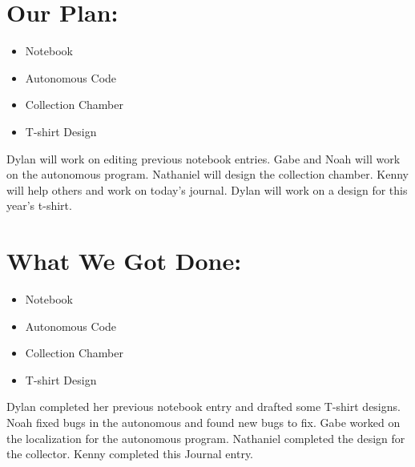 \documentclass[12pt]{article}
\begin{document}
\section{Our Plan:} %
\begin{itemize}
	\item Notebook

	\item Autonomous Code

	\item Collection Chamber

	\item T-shirt Design

\end{itemize}

Dylan will work on editing previous notebook entries. Gabe and Noah will work on the autonomous program. Nathaniel will design the collection chamber. Kenny will help others and work on today’s journal. Dylan will work on a design for this year’s t-shirt.

\section{What We Got Done:} %
\begin{itemize}
	\item Notebook

	\item Autonomous Code

	\item Collection Chamber

	\item T-shirt Design

	\end{itemize}


Dylan completed her previous notebook entry and drafted some T-shirt designs. Noah fixed bugs in the autonomous and found new bugs to fix. Gabe worked on the localization for the autonomous program. Nathaniel completed the design for the collector. Kenny completed this Journal entry. 
\end{document}
